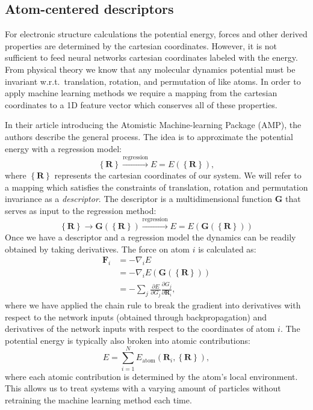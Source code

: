 \subsection{Atom-centered descriptors}
For electronic structure calculations the potential energy,
forces and other derived properties are determined by
the cartesian coordinates. However, it is not sufficient
to feed neural networks cartesian coordinates labeled with
the energy. From physical theory we know that any molecular dynamics potential
must be invariant w.r.t.\ translation, rotation, and permutation
of like atoms.
In order to apply machine learning methods we require a mapping from
the cartesian coordinates to a 1D feature vector which conserves
all of these properties.
\par
In their article introducing the Atomistic Machine-learning Package (AMP),
the authors \parencite[Khorshidi, Peterson]{khorshidi2016amp}
describe the general process.
The idea is to approximate the potential energy with a regression model:
\begin{equation}
\left\{\bm{R}\right\} \overset{\text{regression}}{\longrightarrow}
    E = E\left( \left\{\bm{R}\right\} \right) ,
\end{equation}
where $\left\{\bm{R}\right\}$ represents the cartesian coordinates of our system.
We will refer to a mapping which satisfies the constraints of 
translation, rotation and permutation invariance as a \textit{descriptor}. 
The descriptor is a multidimensional function $\bm{G}$ that serves as input to
the regression method:
\begin{equation}
    \left\{\bm{R}\right\} \rightarrow \bm{G} \left(\left\{\bm{R}\right\} \right)
\overset{\text{regression}}{\longrightarrow}
E = E \left(\bm{G}\left(\left\{\bm{R}\right\}\right)\right)
\end{equation}
Once we have a descriptor and a regression model the dynamics
can be readily obtained by taking derivatives. The force on atom $i$
is calculated as:
\begin{equation}
\begin{split}
    \bm{F}_i &= -\nabla_i E \\
    &= -\nabla_i
    E(\bm{G}(\left\{\bm{R}\right\})) \\
    &= -\sum_j \frac{\partial E}
    {\partial G_j} \frac{\partial G_j}{\partial \bm{R}_i} ,
\end{split}
\end{equation}
where we have applied the chain rule to break the gradient
into derivatives with respect to the network inputs (obtained through
backpropagation) and derivatives of the network inputs with
respect to the coordinates of atom $i$.
The potential energy is typically also broken into
atomic contributions:
\begin{equation}
E = \sum_{i=1}^N E_{\text{atom}}\left(\bm{R}_i, \left\{\bm{R}\right\} \right) ,
\end{equation}
where each atomic contribution is determined by the atom's
local environment. This allows us to treat systems with
a varying amount of particles without retraining
the machine learning method each time.

